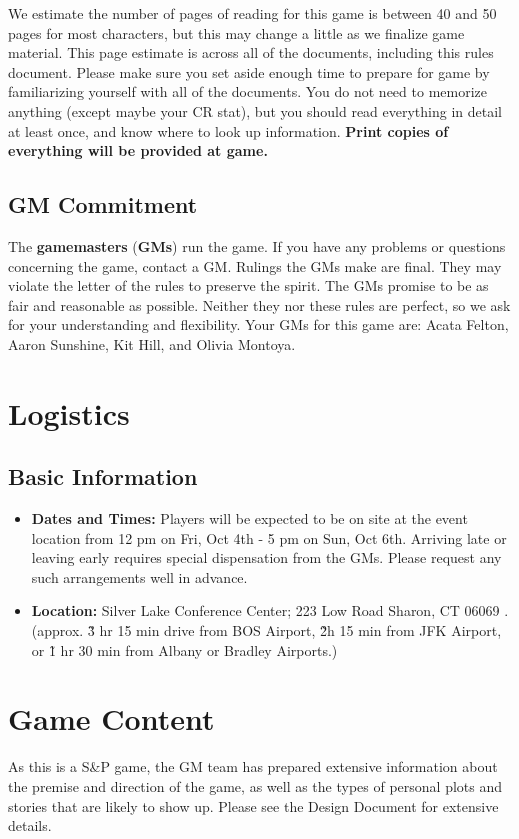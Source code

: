 \documentclass[sheet]{GL2020}
\begin{document}
We estimate the number of pages of reading for this game is between 40 and 50 pages for most characters, but this may change a little as we finalize game material. This page estimate is across all of the documents, including this rules document. Please make sure you set aside enough time to prepare for game by familiarizing yourself with all of the documents. You do not need to memorize anything (except maybe your CR stat), but you should read everything in detail at least once, and know where to look up information. \textbf{Print copies of everything will be provided at game.}

\subsection{GM Commitment}
The \textbf{gamemasters} (\textbf{GMs}) run the game. If you have any problems or questions concerning the game, contact a GM. Rulings the GMs make are final. They may violate the letter of the rules to preserve the spirit. The GMs promise to be as fair and reasonable as possible. Neither they nor these rules are perfect, so we ask for your understanding and flexibility. Your GMs for this game are: Acata Felton, Aaron Sunshine, Kit Hill, and Olivia Montoya.



\section{Logistics}
\subsection{Basic Information}
\begin{itemize}
 \item \textbf{Dates and Times:} Players will be expected to be on site at the event location from 12 pm on Fri, Oct 4th - 5 pm on Sun, Oct 6th. Arriving late or leaving early requires special dispensation from the GMs. Please request any such arrangements well in advance.
 \item \textbf{Location:} Silver Lake Conference Center; 223 Low Road Sharon, CT 06069 . (approx. \~3 hr 15 min drive from BOS Airport, \~2h 15 min from JFK Airport, or \~1 hr 30 min from Albany or Bradley Airports.)
\end{itemize}

\section{Game Content}
As this is a S\&P game, the GM team has prepared extensive information about the premise and direction of the game, as well as the types of personal plots and stories that are likely to show up. Please see the Design Document for extensive details.
\end{document}
